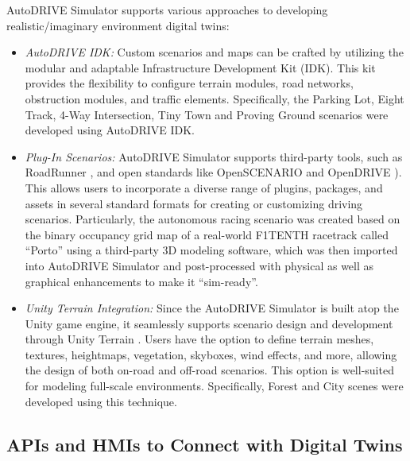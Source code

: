 AutoDRIVE Simulator supports various approaches to developing realistic/imaginary environment digital twins:
\begin{itemize}
     \item \textit{AutoDRIVE IDK:} Custom scenarios and maps can be crafted by utilizing the modular and adaptable Infrastructure Development Kit (IDK). This kit provides the flexibility to configure terrain modules, road networks, obstruction modules, and traffic elements. Specifically, the Parking Lot, Eight Track, 4-Way Intersection, Tiny Town and Proving Ground scenarios were developed using AutoDRIVE IDK.

     \item \textit{Plug-In Scenarios:} AutoDRIVE Simulator supports third-party tools, such as RoadRunner \cite{RoadRunner}, and open standards like OpenSCENARIO \cite{OpenSCENARIO} and OpenDRIVE \cite{OpenDRIVE}). This allows users to incorporate a diverse range of plugins, packages, and assets in several standard formats for creating or customizing driving scenarios. Particularly, the autonomous racing scenario was created based on the binary occupancy grid map of a real-world F1TENTH racetrack called ``Porto'' using a third-party 3D modeling software, which was then imported into AutoDRIVE Simulator and post-processed with physical as well as graphical enhancements to make it ``sim-ready''.

     \item \textit{Unity Terrain Integration:} Since the AutoDRIVE Simulator is built atop the Unity \cite{Unity} game engine, it seamlessly supports scenario design and development through Unity Terrain \cite{UnityTerrain}. Users have the option to define terrain meshes, textures, heightmaps, vegetation, skyboxes, wind effects, and more, allowing the design of both on-road and off-road scenarios. This option is well-suited for modeling full-scale environments. Specifically, Forest and City scenes were developed using this technique.
\end{itemize}

\hypertarget{APIs and HMIs to Connect with Digital Twins}{%
\subsection{APIs and HMIs to Connect with Digital Twins}\label{APIs and HMIs to Connect with Digital Twins}}


